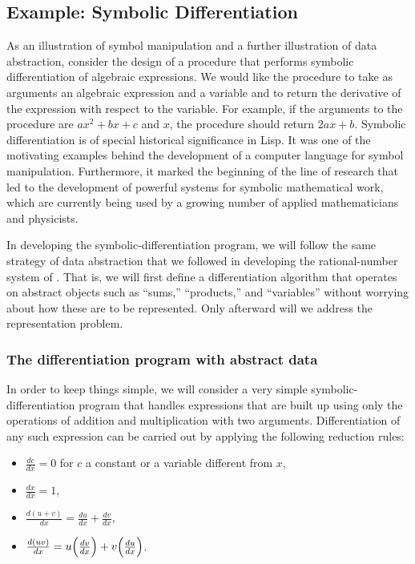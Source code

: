 \subsection{Example: Symbolic Differentiation}
\label{Section 2.3.2}

As an illustration of symbol manipulation and a further illustration of data abstraction, consider the design of a procedure that performs symbolic differentiation of algebraic expressions.
We would like the procedure to take as arguments an algebraic expression and a variable and to return the derivative of the expression with respect to the variable.
For example, if the arguments to the procedure are \( a x^2 + b x + c \) and \( x \), the procedure should return \( 2a x + b \).
Symbolic differentiation is of special historical significance in Lisp.
It was one of the motivating examples behind the development of a computer language for symbol manipulation.
Furthermore, it marked the beginning of the line of research that led to the development of powerful systems for symbolic mathematical work, which are currently being used by a growing number of applied mathematicians and physicists.

In developing the symbolic-differentiation program, we will follow the same strategy of data abstraction that we followed in developing the rational-number system of .
That is, we will first define a differentiation algorithm that operates on abstract objects such as “sums,” “products,” and “variables” without worrying about how these are to be represented.
Only afterward will we address the representation problem.



\subsubsection*{The differentiation program with abstract data}

In order to keep things simple, we will consider a very simple symbolic-differentiation program that handles expressions that are built up using only the operations of addition and multiplication with two arguments.
Differentiation of any such expression can be carried out by applying the following reduction rules:
\begin{itemize}

	\item
		\( \frac{dc}{dx} = 0 \) for \( c \) a constant or a variable different from \( x \),

	\item
		\( \frac{dx}{dx} = 1 \),

	\item
		\( \frac{d(u + v)}{dx} = \frac{du}{dx} + \frac{dv}{dx} \),

	\item
		\( \frac{d(uv)}{dx} = u \Bigl( \frac{dv}{dx} \Bigr) + v \Bigl( \frac{du}{dx} \Bigr) \).
\end{itemize}

